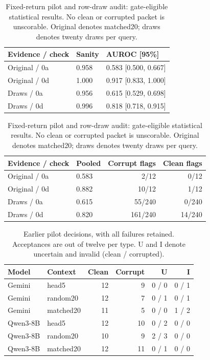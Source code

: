 \documentclass[letterpaper]{article}
\begin{document}
\begin{table}[tbp]
\centering
{\small
\setlength{\tabcolsep}{3pt}
\begin{tabular}{lll}
\toprule
Evidence / check & Sanity & AUROC [95\%] \\ \midrule
Original / 0a & 0.958 & 0.583 [0.500, 0.667] \\
Original / 0d & 1.000 & 0.917 [0.833, 1.000] \\
Draws / 0a & 0.956 & 0.615 [0.529, 0.698] \\
Draws / 0d & 0.996 & 0.818 [0.718, 0.915] \\
\bottomrule
\end{tabular}
}

\par\medskip
{\small
\setlength{\tabcolsep}{3pt}
\begin{tabular}{llrr}
\toprule
Evidence / check & Pooled & Corrupt flags & Clean flags \\ \midrule
Original / 0a & 0.583 & 2/12 & 0/12 \\
Original / 0d & 0.882 & 10/12 & 1/12 \\
Draws / 0a & 0.615 & 55/240 & 0/240 \\
Draws / 0d & 0.820 & 161/240 & 14/240 \\
\bottomrule
\end{tabular}
}
\caption{Fixed-return pilot and row-draw audit: gate-eligible statistical results. No clean or corrupted packet is unscorable. Original denotes matched20; draws denotes twenty draws per query.}
\label{tab:statistics}
\end{table}

\begin{table}[tbp]
\centering
{\small
\setlength{\tabcolsep}{3pt}
\begin{tabular}{llrrrr}
\toprule
Model & Context & Clean & Corrupt & U & I \\ \midrule
Gemini & head5 & 12 & 9 & 0 / 0 & 0 / 1 \\
Gemini & random20 & 12 & 7 & 0 / 1 & 0 / 1 \\
Gemini & matched20 & 11 & 5 & 0 / 0 & 1 / 2 \\
Qwen3-8B & head5 & 12 & 10 & 0 / 2 & 0 / 0 \\
Qwen3-8B & random20 & 10 & 9 & 2 / 3 & 0 / 0 \\
Qwen3-8B & matched20 & 12 & 11 & 0 / 1 & 0 / 0 \\
\bottomrule
\end{tabular}
}

\caption{Earlier pilot decisions, with all failures retained. Acceptances are out of twelve per type. U and I denote uncertain and invalid (clean / corrupted).}
\label{tab:pilot}
\end{table}
\end{document}
